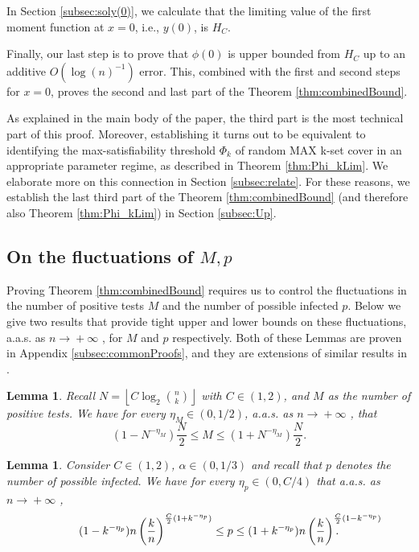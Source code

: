 \documentclass[12pt,reqno]{amsart}
\numberwithin{equation}{section}
\newtheorem{lemma}[theorem]{Lemma}
\theoremstyle{definition}
\newcommand{\floor}[1]{\left\lfloor #1 \right\rfloor}
\newcommand{\conv}[1]{\overset{#1}{\rightarrow}}
\renewcommand{\[}{\begin{equation}}
\renewcommand{\]}{\end{equation}}
\renewcommand{\|}{\bigg{|}}
\newcommand{\maxwell}[1]{\textcolor{Goldenrod}{\;Max: #1}}
\newcommand{\kset}{random MAX k-set cover }
\newcommand{\ngrow}{\ensuremath{n \conv{} +\infty} }
\newcommand{\kpert}{\log\left(n\right)^{-1}}
\begin{document}
In Section \ref{subsec:soly(0)}, we calculate that the limiting value of the first moment function at $x=0$, i.e., $y(0)$, is $H_C$. 


Finally, our last step is to prove that $\phi(0)$ is upper bounded from $H_C$ up to an additive $O(\kpert)$ error. This, combined with the first and second steps for $x=0$, proves the second and last part of the Theorem \ref{thm:combinedBound}. 

As explained in the main body of the paper, the third part is the most technical part of this proof. Moreover, establishing it turns out to be equivalent to identifying the max-satisfiability threshold $\Phi_k$ of \kset in an appropriate parameter regime, as described in Theorem \ref{thm:Phi_kLim}. We elaborate more on this connection in Section \ref{subsec:relate}. For these reasons, we establish the last third part of the Theorem \ref{thm:combinedBound} (and therefore also Theorem \ref{thm:Phi_kLim}) in Section \ref{subsec:Up}. 

\subsection{On the fluctuations of $M,p$}\label{subsec:Plan}
Proving Theorem \ref{thm:combinedBound} requires us to control the fluctuations in the number of positive tests $M$ and the number of possible infected $p$. Below we give two results that provide tight upper and lower bounds on these fluctuations, a.a.s. as \ngrow\!, for $M$ and $p$ respectively. Both of these Lemmas are proven in Appendix \ref{subsec:commonProofs}, and they are extensions of similar results in \cite{iliopoulos2021group}.

\begin{lemma}\label{lem:M:limit}
    Recall $N = \floor{C \log_2\binom{n}{k}}$ with $C \in (1,2)$, and $M$ as the number of positive tests. 
    We have for every $\eta_M \in (0,1/2)$, a.a.s. as \ngrow\!, that
    \[(1-N^{-\eta_M})\frac{N}{2}\leq M \leq (1+N^{-\eta_M})\frac{N}{2}.\]
\end{lemma}

\begin{lemma}\label{lem:p:limit}
    Consider $C \in (1,2)$, $\alpha \in (0,1/3)$ and recall that $p$ denotes the number of possible infected. We have for every $\eta_p \in (0,C/4)$ that a.a.s. as \ngrow\!,
    \[(1-k^{-\eta_p})n\left(\frac{k}{n}\right)^{\frac{C}{2}(1+k^{-\eta_p})}\leq p \leq (1+k^{-\eta_p})n\left(\frac{k}{n}\right)^{\frac{C}{2}(1-k^{-\eta_p})}\hspace{-1.5cm}.\]
\end{lemma}
\end{document}
